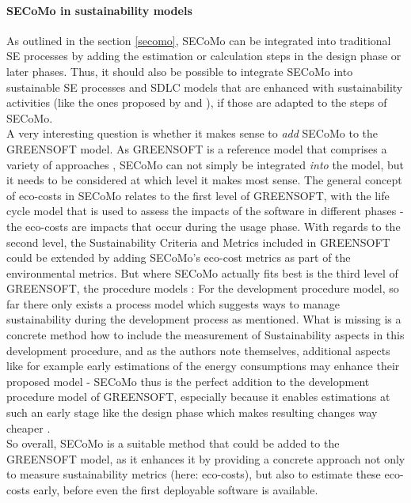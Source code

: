 \documentclass[oribibl]{llncs}
\begin{document}
\paragraph{SECoMo in sustainability models}
As outlined in the section \ref{secomo}, SECoMo can be integrated into traditional SE processes by adding the estimation or calculation steps in the design phase or later phases. Thus, it should also be possible to integrate SECoMo into sustainable SE processes and SDLC models that are enhanced with sustainability activities (like the ones proposed by \cite{agarwal_sustainable_2012} and \cite{shenoy_green_2011}), if those are adapted to the steps of SECoMo.\\
A very interesting question is whether it makes sense to \textit{add} SECoMo to the GREENSOFT model. As GREENSOFT is a reference model that comprises a variety of approaches \cite{naumann_greensoft_2011}, SECoMo can not simply be integrated \textit{into} the model, but it needs to be considered at which level it makes most sense. The general concept of eco-costs in SECoMo relates to the first level of GREENSOFT, with the life cycle model that is used to assess the impacts of the software in different phases \cite{naumann_greensoft_2011} - the eco-costs are impacts that occur during the usage phase. With regards to the second level, the Sustainability Criteria and Metrics included in GREENSOFT could be extended by adding SECoMo's eco-cost metrics as part of the environmental metrics. But where SECoMo actually fits best is the third level of GREENSOFT, the procedure models \cite{naumann_greensoft_2011}: For the development procedure model, so far there only exists a process model which suggests ways to manage sustainability during the development process %
as mentioned. What is missing is a concrete method how to include the measurement of Sustainability aspects in this development procedure, and as the authors note themselves, additional aspects like for example early estimations of the energy consumptions may enhance their proposed model \cite{naumann_greensoft_2011} %
- SECoMo thus is the perfect addition to the development procedure model of GREENSOFT, especially because it enables estimations at such an early stage like the design phase which makes resulting changes way cheaper \cite{schulze_cost_2016}.\\
So overall, SECoMo is a suitable method that could be added to the GREENSOFT model, as it enhances it by providing a concrete approach not only to measure sustainability metrics (here: eco-costs), but also to estimate these eco-costs early, before even the first deployable software is available.
\end{document}
